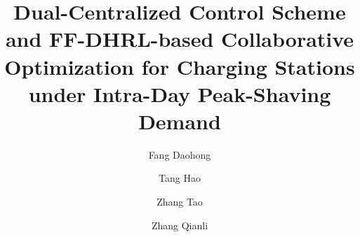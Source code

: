\documentclass[preprint,12pt]{elsarticle}
\begin{document}
\begin{frontmatter}



\title{Dual-Centralized Control Scheme and FF-DHRL-based Collaborative Optimization for Charging Stations under Intra-Day Peak-Shaving Demand}



\author[1,2]{Fang Daohong}

\author[1]{Tang Hao }

\author[1]{Zhang Tao}  

\author[1]{Zhang Qianli}  

\address[1]{School of Electrical Engineering and Automation, Hefei University of Technology, Hefei, 230009, China}
\address[2]{School of Electrical and Computer Engineering, National Technical University of Athens, Athens, 10682, Greece}


\end{frontmatter}
\end{document}
